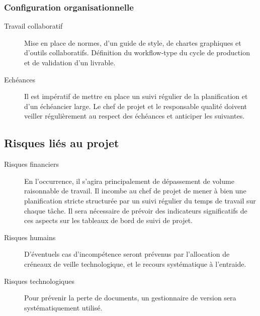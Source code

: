 \subsubsection{Configuration organisationnelle}

\begin{description}
    \item[Travail collaboratif] Mise en place de normes, d'un guide de style,
        de chartes graphiques et d'outils collaboratifs.  Définition du
        workflow-type du cycle de production et de validation d'un livrable.
    \item[Echéances] Il est impératif de mettre en place un suivi régulier de
        la planification et d'un échéancier large. Le chef de projet et le
        responsable qualité doivent veiller régulièrement au respect des
        échéances et anticiper les suivantes.
\end{description}

\subsection{Risques liés au projet}

\begin{description}
    \item[Risques financiers] En l'occurrence, il s'agira principalement de
        dépassement de volume raisonnable de travail.  Il incombe au chef de
        projet de mener à bien une planification stricte structurée par un
        suivi régulier du temps de travail sur chaque tâche. Il sera nécessaire
        de prévoir des indicateurs significatifs de ces aspects sur les
        tableaux de bord de suivi de projet.
    \item[Risques humains] D'éventuels cas d'incompétence seront prévenus par
        l'allocation de créneaux de veille technologique, et le recours
        systématique à l'entraide.
    \item[Risques technologiques] Pour prévenir la perte de documents, un
        gestionnaire de version sera systématiquement utilisé.
\end{description}



